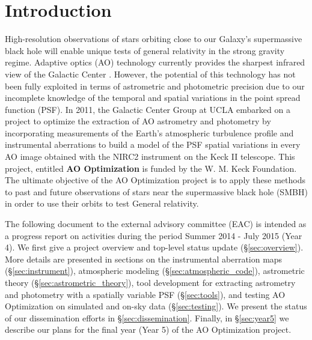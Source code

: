 \section{Introduction}

High-resolution observations of stars orbiting close to our Galaxy's supermassive black hole will enable unique tests of general relativity in the strong gravity regime. Adaptive optics (AO) technology currently provides the sharpest infrared view of the Galactic Center \cite{Ghez_2005}. However, the potential of this technology has not been fully exploited in terms of astrometric and photometric precision due to our incomplete knowledge of the temporal and spatial variations in the point spread function (PSF). In 2011, the Galactic Center Group at UCLA embarked on a project to optimize the extraction of AO astrometry and photometry by incorporating measurements of the Earth's atmospheric turbulence profile and instrumental aberrations to build a model of the PSF spatial variations in every AO image obtained with the NIRC2 instrument on the Keck II telescope. This project, entitled \textbf{AO Optimization} is funded by the W. M. Keck Foundation. The ultimate objective of the AO Optimization project is to apply these methods to past and future observations of stars near the supermassive black hole (SMBH) in order to use their orbits to test General relativity. 

The following document to the external advisory committee (EAC) is intended as a progress report on activities during the period Summer 2014 - July 2015 (Year 4). We first give a project overview and top-level status update (\S\ref{sec:overview}). More details are presented in sections on the instrumental aberration maps (\S\ref{sec:instrument}), atmospheric modeling (\S\ref{sec:atmospheric_code}), astrometric theory (\S\ref{sec:astrometric_theory}), tool development for extracting astrometry and photometry with a spatially variable PSF (\S\ref{sec:tools}), and testing AO Optimization on simulated and on-sky data (\S\ref{sec:testing}). We present the status of our dissemination efforts in \S\ref{sec:dissemination}. Finally, in \S\ref{sec:year5} we describe our plans for the final year (Year 5) of the AO Optimization project.



  
  